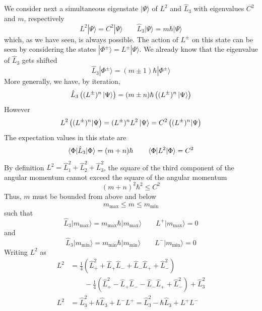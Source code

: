 \documentclass[../../../main.tex]{subfiles}
\begin{document}
We consider next a simultaneous eigenstate $|\Psi\rangle$ of $L^2$ and $\hat{L}_3$ with eigenvalues $C^2$ and $m$, respectively
\begin{equation*}
    L^2|\Psi\rangle = C^2|\Psi\rangle     \qquad
    \hat{L}_3|\Psi\rangle = m \hbar |\Psi\rangle
\end{equation*}
which, as we have seen, is always possible.
The action of  $L^\pm$ on this state can be seen by considering the states $|\Phi^\pm\rangle = L^\pm|\Psi\rangle$.
We already know that the eigenvalue of $\hat{L}_3$ gets shifted
\begin{equation*}
    \hat{L}_3|\Phi^\pm\rangle = (m \pm 1) \hbar |\Phi^\pm\rangle
\end{equation*}
More generally, we have, by iteration,
\begin{equation*}
    \hat{L}_3 \left( (L^{\pm})^n  \ket{\Psi} \right) = (m \pm n) \hbar  \left( (L^{\pm})^n \ket{\Psi} \right)
\end{equation*}
However
\begin{equation*}
    L^2 \left( (L^{\pm})^n | \Psi \right) = (L^{\pm})^n L^2 \ket{\Psi} = C^2 \left( (L^{\pm})^n | \Psi \right)
\end{equation*}
The  expectation values in this state are
\begin{equation*}
    \braket{\Phi | \hat{L}_3|\Phi} = (m+n) \hbar \qquad
    \braket{\Phi | L^2|\Phi} = C^2
\end{equation*}
By definition $L^2=\hat{L}_1^2+\hat{L}_2^2+\hat{L}_3^2$, the square of the third component of the angular momentum cannot exceed the square of the angular momentum
\begin{equation*}
    (m + n)^2 \hbar ^2 \leq C^2
\end{equation*}
Thus, \( m \) must be bounded from above and below
\begin{equation*}
    m_{\text{max}} \leq m \leq m_{\text{min}}
\end{equation*}
such that
\begin{equation*}
    \hat{L}_3 | m_{\text{max}} \rangle = m_{\text{max}} \hbar  | m_{\text{max}} \rangle \qquad
    L^+ | m_{\text{max}} \rangle = 0
\end{equation*}
and
\begin{equation*}
    \hat{L}_3 | m_{\text{min}} \rangle = m_{\text{min}} \hbar  | m_{\text{min}} \rangle \qquad
    L^- | m_{\text{min}} \rangle = 0
\end{equation*}
Writing $L^2$ as
\begin{align*}
    L^2 & = \frac{1}{4} \left( \hat{L}_+^2 + \hat{L}_+ \hat{L}_- + \hat{L}_- \hat{L}_+ + \hat{L}_-^2 \right)                     \\
        & \qquad - \frac{1}{4} \left( \hat{L}_+^2 - \hat{L}_+ \hat{L}_- - \hat{L}_- \hat{L}_+ + \hat{L}_-^2 \right) +\hat{L}_3^2 \\
    L^2
        & = \hat{L}_3^2 +\hbar  \hat{L}_3 + L^- L^+ =  \hat{L}_3^2 - \hbar \hat{L}_3 + L^+ L^-
\end{align*}
\end{document}
